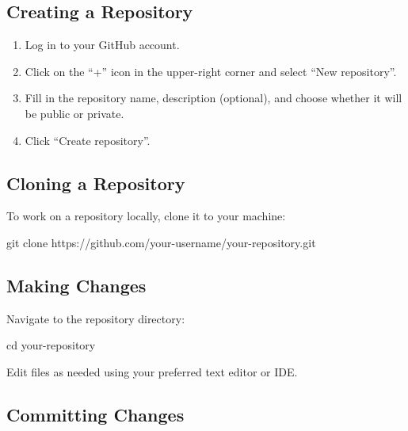 \documentclass[
  letterpaper,
  DIV=11,
  numbers=noendperiod]{scrreprt}
\newenvironment{Shaded}{\begin{snugshade}}{\end{snugshade}}
\newcommand{\BuiltInTok}[1]{\textcolor[rgb]{0.00,0.23,0.31}{#1}}
\newcommand{\FunctionTok}[1]{\textcolor[rgb]{0.28,0.35,0.67}{#1}}
\newcommand{\NormalTok}[1]{\textcolor[rgb]{0.00,0.23,0.31}{#1}}
\providecommand{\tightlist}{%
  \setlength{\itemsep}{0pt}\setlength{\parskip}{0pt}}\usepackage{longtable,booktabs,array}
\begin{document}
\subsection{Creating a Repository}\label{creating-a-repository}

\begin{enumerate}
\def\labelenumi{\arabic{enumi}.}
\tightlist
\item
  Log in to your GitHub account.
\item
  Click on the ``+'' icon in the upper-right corner and select ``New
  repository''.
\item
  Fill in the repository name, description (optional), and choose
  whether it will be public or private.
\item
  Click ``Create repository''.
\end{enumerate}

\subsection{Cloning a Repository}\label{cloning-a-repository-1}

To work on a repository locally, clone it to your machine:

\begin{Shaded}
\begin{Highlighting}[]
\FunctionTok{git}\NormalTok{ clone https://github.com/your{-}username/your{-}repository.git}
\end{Highlighting}
\end{Shaded}

\subsection{Making Changes}\label{making-changes}

Navigate to the repository directory:

\begin{Shaded}
\begin{Highlighting}[]
\BuiltInTok{cd}\NormalTok{ your{-}repository}
\end{Highlighting}
\end{Shaded}

Edit files as needed using your preferred text editor or IDE.

\subsection{Committing Changes}\label{committing-changes-1}
\end{document}
